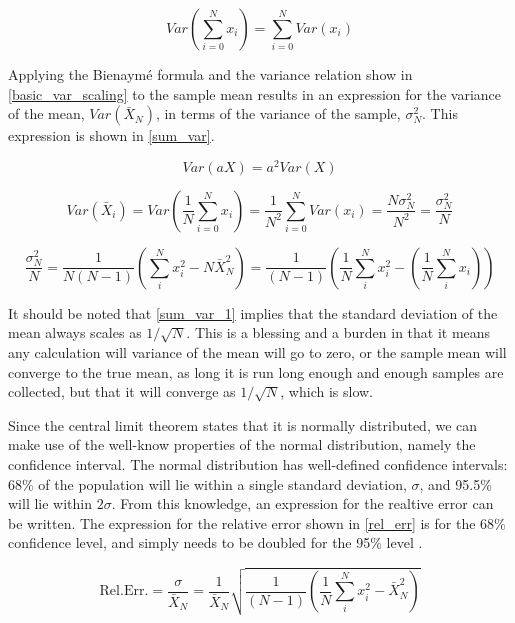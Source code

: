 \begin{equation}
\label{bien}
Var\left(\sum_{i=0}^N x_i \right) = \sum_{i=0}^N Var(x_i)
\end{equation}      


Applying the Bienaym\'e formula and the variance relation show in \eqref{basic_var_scaling} to the sample mean results in an expression for the variance of the mean, $Var(\bar{X}_N)$, in terms of the variance of the sample, $\sigma_N^2$.  This expression is shown in \eqref{sum_var}.  

\begin{equation}
\label{basic_var_scaling}
Var\left(a X \right) = a^2 Var\left( X \right)
\end{equation}

\begin{equation}
\label{sum_var_1}
Var(\bar{X}_i) = Var\left(\frac{1}{N}\sum_{i=0}^N x_i \right) = \frac{1}{N^2} \sum_{i=0}^N Var(x_i) = \frac{N\sigma_N^2}{N^2} =  \frac{\sigma_N^2}{N} 
\end{equation}

\begin{equation}
\label{sum_var}
 \frac{\sigma_N^2}{N} = \frac{1}{N(N-1)} \left( \sum_i^N x_i^2- N\bar{X}_N^2 \right) = \frac{1}{(N-1)} \left( \frac{1}{N} \sum_i^N x_i^2 - \left(   \frac{1}{N} \sum_i^N x_i \right)   \right)
\end{equation}

It should be noted that \eqref{sum_var_1} implies that the standard deviation of the mean always scales as $1/\sqrt{N}$.  This is a blessing and a burden in that it means any calculation will variance of the mean will go to zero, or the sample mean will converge to the true mean, as long it is run long enough and enough samples are collected, but that it will converge as $1/\sqrt{N}$, which is slow.

Since the central limit theorem states that it is normally distributed, we can make use of the well-know properties of the normal distribution, namely the confidence interval.  The normal distribution has well-defined confidence intervals: 68\% of the population will lie within a single standard deviation, $\sigma$, and 95.5\% will lie within $2\sigma$.  From this knowledge, an expression for the realtive error can be written.  The expression for the relative error shown in \eqref{rel_err} is for the 68\% confidence level, and simply needs to be doubled for the 95\% level \cite{MCNP}\cite{jaakko}.

\begin{equation}
\label{rel_err}
\mathrm{Rel. Err.} = \frac{\sigma}{\bar{X}_N} = \frac{1}{\bar{X}_N}\sqrt{\frac{1}{(N-1)} \left( \frac{1}{N}\sum_i^N x_i^2-\bar{X}_N^2 \right)}
\end{equation}

